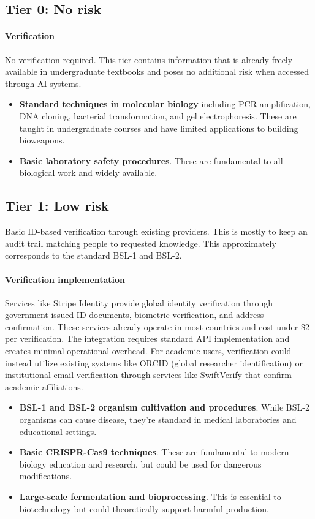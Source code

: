 \documentclass{article}
\theoremstyle{plain}
\theoremstyle{definition}
\theoremstyle{remark}
\begin{document}
\subsection{Tier 0: No risk}

\paragraph{Verification} No verification required. This tier contains information that is already freely available in undergraduate textbooks and poses no additional risk when accessed through AI systems.

\begin{itemize}
  \item \textbf{Standard techniques in molecular biology} including PCR amplification, DNA cloning, bacterial transformation, and gel electrophoresis. These are taught in undergraduate courses and have limited applications to building bioweapons.
  \item \textbf{Basic laboratory safety procedures}. These are fundamental to all biological work and widely available.
\end{itemize}

\subsection{Tier 1: Low risk}

Basic ID-based verification through existing providers. This is mostly to keep an audit trail matching people to requested knowledge. This approximately corresponds to the standard BSL-1 and BSL-2.

\paragraph{Verification implementation} Services like Stripe Identity provide global identity verification through government-issued ID documents, biometric verification, and address confirmation. These services already operate in most countries and cost under \$2 per verification. The integration requires standard API implementation and creates minimal operational overhead. For academic users, verification could instead utilize existing systems like ORCID (global researcher identification) or institutional email verification through services like SwiftVerify that confirm academic affiliations.

\begin{itemize}
  \item \textbf{BSL-1 and BSL-2 organism cultivation and procedures}. While BSL-2 organisms can cause disease, they're standard in medical laboratories and educational settings.
  \item \textbf{Basic CRISPR-Cas9 techniques}. These are fundamental to modern biology education and research, but could be used for dangerous modifications.
  \item \textbf{Large-scale fermentation and bioprocessing}. This is essential to biotechnology but could theoretically support harmful production.
\end{itemize}
\end{document}
